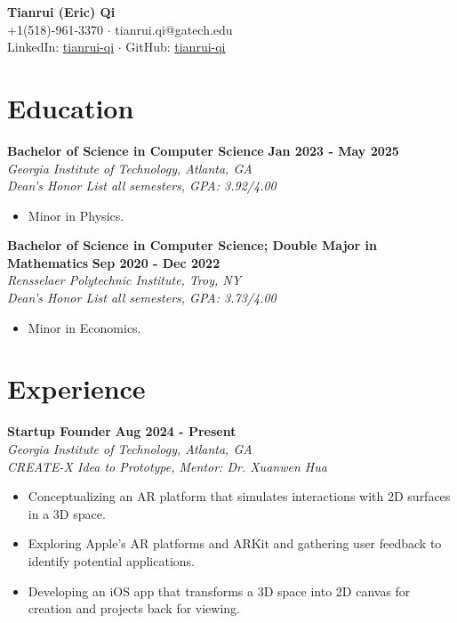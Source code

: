 \documentclass[letterpaper, 11pt]{article}
\newcommand{\subsectionvspace}{\vspace{6pt}}
\begin{document}
\begin{center}
    \textbf{\LARGE Tianrui (Eric) Qi} \\
    +1(518)-961-3370 
    $\cdot$ 
    tianrui.qi@gatech.edu
    \\
    LinkedIn: \href{https://www.linkedin.com/in/tianrui-qi/}{\underline{tianrui-qi}}
    $\cdot$
    GitHub: \href{https://github.com/tianrui-qi}{\underline{tianrui-qi}}
\end{center}


\section{Education}


    \textbf{Bachelor of Science in Computer Science} \hfill 
    \textbf{Jan 2023 - May 2025} \\
    \textit{Georgia Institute of Technology, Atlanta, GA} \\ 
    \textit{Dean's Honor List all semesters, GPA: 3.92/4.00}
    \begin{itemize}
        \item Minor in Physics.
    \end{itemize}

    \subsectionvspace

    \textbf{Bachelor of Science in Computer Science; Double Major in Mathematics} \hfill 
    \textbf{Sep 2020 - Dec 2022} \\
    \textit{Rensselaer Polytechnic Institute, Troy, NY} \\ 
    \textit{Dean's Honor List all semesters, GPA: 3.73/4.00}
    \begin{itemize}
        \item Minor in Economics.
    \end{itemize}


\section{Experience}


    \textbf{Startup Founder} \hfill 
    \textbf{Aug 2024 - Present} \\
    \textit{Georgia Institute of Technology, Atlanta, GA} \\
    \textit{CREATE-X Idea to Prototype, Mentor: Dr. Xuanwen Hua}
    \begin{itemize}
        \item Conceptualizing an AR platform that simulates interactions with 2D surfaces in a 3D space.
        \item Exploring Apple's AR platforms and ARKit and gathering user feedback to identify potential applications. 
        \item Developing an iOS app that transforms a 3D space into 2D canvas for creation and projects back for viewing.
    \end{itemize}
\end{document}
